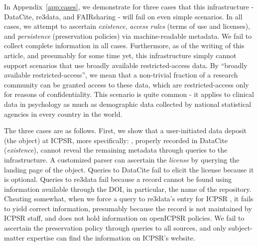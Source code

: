 In Appendix~\ref{app:cases}, we demonstrate for three cases that this infrastructure - DataCite, re3data, and FAIRsharing - will fail on even simple scenarios. In all cases, we attempt to ascertain \textit{existence}, \textit{access rules} (terms of use and licenses), and \textit{persistence} (preservation policies) via machine-readable metadata. We fail to collect complete information in  all cases. Furthermore, as of the writing of this article, and presumably for some time yet, this infrastructure simply cannot support scenarios that use broadly available restricted-access data. By ``broadly available restricted-access'', we mean that a non-trivial fraction of a research community can be granted access to these data, which are restricted-access only for reasons of confidentiality. This scenario is quite common - it applies to clinical data in psychology as much as demographic data collected by national statistical agencies in every country in the world. 

The three cases are as follows. First, we show that a user-initiated data deposit (the object) at {\ac{ICPSR}}, more specifically: , properly recorded in DataCite (\textit{existence}), cannot reveal the remaining metadata through queries to the infrastructure. A customized parser can ascertain the \textit{license} by querying the landing page of the object. Queries to DataCite fail to elicit the  license because it is optional. Queries to re3data fail because a record cannot be found using information available through the \ac{DOI}, in particular, the name of the repository. Cheating somewhat, when we force a query to re3data's entry for \ac{ICPSR} \parencite{Re3data-icpsr}, it fails to yield correct information, presumably because the record is not maintained by ICPSR staff, and does not hold information on openICPSR policies. We fail to ascertain the preservation policy through queries to all sources, and only subject-matter expertise can find the information on ICPSR's website. 

